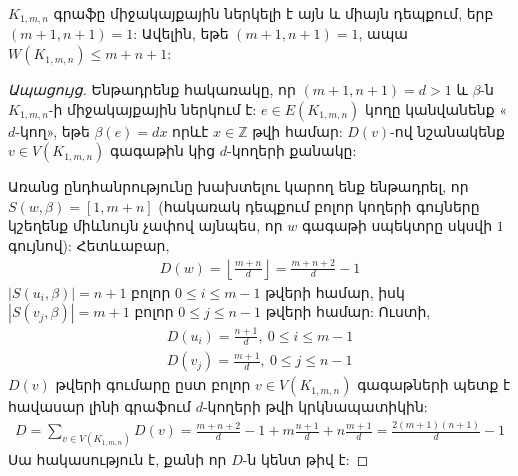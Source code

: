 \begin{theorem}
\label{t1_K1mn_nocoprime}
$K_{1,m,n}$ գրաֆը միջակայքային ներկելի է այն և միայն դեպքում, երբ $(m+1,n+1)=1$: Ավելին, եթե $(m+1,n+1)=1$, ապա $W(K_{1,m,n}) \leq m+n+1$:
\end{theorem}
\begin{proof}[Ապացույց]
Ենթադրենք հակառակը, որ $(m+1,n+1) = d >1$ և $\beta$-ն $K_{1,m,n}$-ի միջակայքային ներկում է:
$e \in E(K_{1,m,n})$ կողը կանվանենք «$d$-կող», եթե $\beta(e) = dx$ որևէ $x \in \mathbb{Z}$ թվի համար: $D(v)$-ով նշանակենք $v \in V(K_{1,m,n})$ գագաթին կից $d$-կողերի քանակը:

Առանց ընդհանրությունը խախտելու կարող ենք ենթադրել, որ $S(w,\beta) = [1,m+n]$
(հակառակ դեպքում բոլոր կողերի գույները կշեղենք միևնույն չափով այնպես, որ $w$ գագաթի սպեկտրը սկսվի $1$ գույնով): Հետևաբար,
\begin{align*}
D(w) = \left\lfloor \frac{m+n}{d} \right\rfloor = \frac{m+n+2}{d}-1
\end{align*}
$\left| S(u_i, \beta) \right| = n+1$ բոլոր $0\leq i \leq m-1$ թվերի համար, իսկ $\left|
S(v_j, \beta) \right| = m+1$ բոլոր $0\leq j \leq n-1$ թվերի համար: Ուստի,
\begin{align*}
D(u_i) = \frac{n+1}{d},\ 0\leq i \leq m-1\\
D(v_j) = \frac{m+1}{d},\ 0\leq j \leq n-1
\end{align*}
$D(v)$ թվերի գումարը ըստ բոլոր $v \in V(K_{1,m,n})$ գագաթների պետք է հավասար լինի գրաֆում $d$-կողերի թվի կրկնապատիկին:
\begin{align*}
D = \sum_{v \in V(K_{1,m,n})}{D(v)} = \frac{m+n+2}{d}-1 + m\frac{n+1}{d} +
n\frac{m+1}{d} = \frac{2(m+1)(n+1)}{d} - 1
\end{align*}
Սա հակասություն է, քանի որ $D$-ն կենտ թիվ է:
\end{proof}

